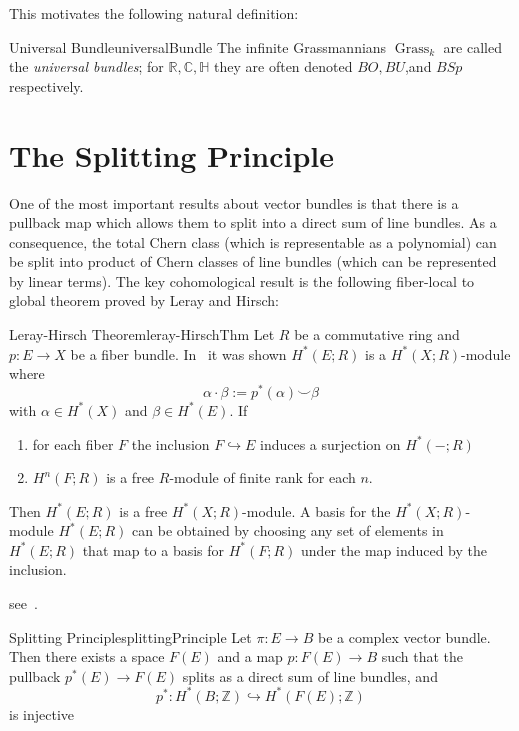 \documentclass{ut-thesis}
\newenvironment{Proof}[1][]
  {\begin{ProofTcb}[#1]}
  {\end{ProofTcb}}
\newcommand{\R}{{\mathbb{R}}}
\newcommand{\Z}{{\mathbb{Z}}}
\newcommand{\C}{{\mathbb{C}}}
\renewcommand{\H}{{\mathbb{H}}}
\newcommand{\Grass}{{\operatorname{Grass}}}
\begin{document}
\begin{Proof}
  \cite[section~1.2]{NateKTheory}
\end{Proof}

This motivates the following natural definition:

\begin{defn}{Universal Bundle}{universalBundle}
  The infinite Grassmannians $\Grass_{k}$ are called the \emph{universal bundles}; for $\R, \C, \H$ they are often
	denoted $BO, BU$,and $BSp$ respectively.
\end{defn}

\section{The Splitting Principle}

One of the most important results about vector bundles is that there is a pullback map which allows them to split
into a direct sum of line bundles. As a consequence, the total Chern class (which is representable as
a polynomial) can be split into product of Chern classes of line bundles (which can be represented by linear
terms). The key cohomological result is the following fiber-local to global theorem proved by Leray and
Hirsch:

\begin{thm}{Leray-Hirsch Theorem}{leray-HirschThm}
	Let $R$ be a commutative ring and $p: E \to X$ be a fiber bundle. In~\cite{NateAlgTop} it was shown $H^*(E;R)$
	is a $H^*(X;R)$-module where
	\[
		\alpha\cdot \beta := p^*(\alpha)\smile \beta
	\]
	with $\alpha \in H^*(X)$ and $\beta \in H^*(E)$. If
	\begin{enumerate}
		\item for each fiber $F$ the inclusion $F \hookrightarrow E$ induces a surjection on $H^*(-;R)$
		\item $H^n(F;R)$ is a free $R$-module of finite rank for each $n$.
	\end{enumerate}
	Then $H^*(E;R)$ is a free $H^*(X;R)$-module. A basis for the $H^*(X;R)$-module $H^*(E;R)$ can be obtained
	by choosing any set of elements in $H^*(E;R)$ that map to a basis for $H^*(F;R)$ under the map induced by
	the inclusion.
\end{thm}

\begin{Proof}
	see~\cite{NateAlgTop}.
\end{Proof}


\begin{thm}{Splitting Principle}{splittingPrinciple}
	Let $\pi: E \to B$ be a complex vector bundle. Then there exists a space $F(E)$ and a map $p: F(E) \to B$ such
	that the pullback $p^*(E) \to F(E)$ splits as a direct sum of line bundles, and
	\[
		p^*: H^*(B; \Z) \hookrightarrow H^*(F(E); \Z)
	\]
	is injective
\end{thm}
\end{document}

